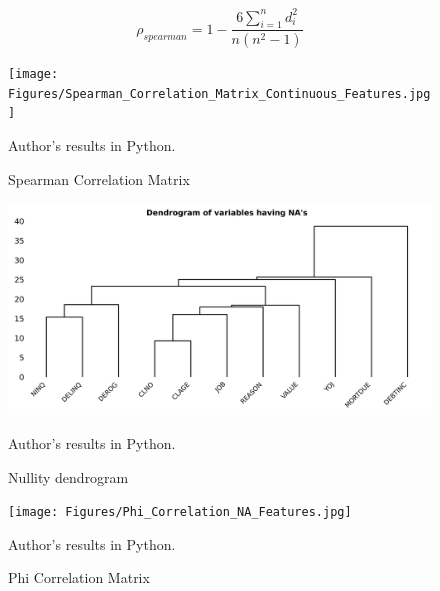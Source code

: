 \begin{equation}\label{eq}
	\rho_{spearman} = 1 - \frac{6 \sum_{i=1}^{n} d_{i}^{2}}{n \left(n^{2}-1\right)}
	\end{equation}

    \begin{figure}[H]
        \begin{center}
        \caption{Spearman Correlation Matrix}
        \label{fig:supply}
        \texttt{[image: Figures/Spearman\_Correlation\_Matrix\_Continuous\_Features.jpg]}
    \end{center}
    \begin{center}
        \begin{source}Author's results in Python.\end{source}
        \end{center}
    \end{figure}


    \begin{figure}[H]
        \begin{center}
        \caption{Nullity dendrogram}
        \label{fig:supply}
        \includegraphics[width=150mm]{Figures/NA_Dendrogram.jpg}
    \end{center}
    \begin{center}
        \begin{source}Author's results in Python.\end{source}
        \end{center}
    \end{figure}
    

    \begin{figure}[H]
        \begin{center}
        \caption{Phi Correlation Matrix}
        \label{fig:supply}
        \texttt{[image: Figures/Phi\_Correlation\_NA\_Features.jpg]}
    \end{center}
    \begin{center}
        \begin{source}Author's results in Python.\end{source}
        \end{center}
    \end{figure}


